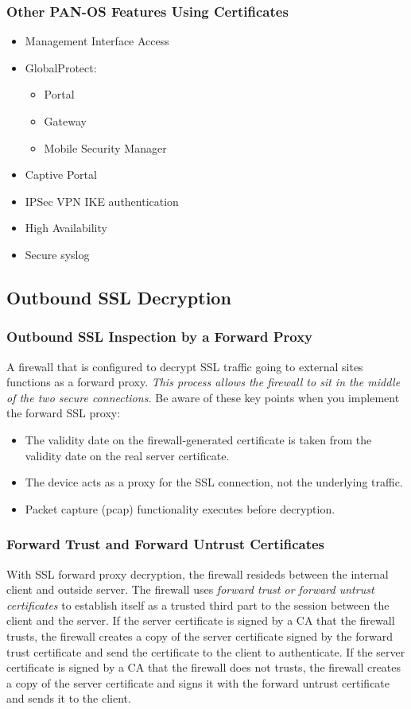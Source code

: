 \subsubsection{Other PAN-OS Features Using Certificates}
\begin{itemize}
    \item Management Interface Access
    \item GlobalProtect:
        \begin{itemize}
            \item Portal
            \item Gateway
            \item Mobile Security Manager
        \end{itemize}
    \item Captive Portal
    \item IPSec VPN IKE authentication
    \item High Availability 
    \item Secure syslog
\end{itemize}

\subsection{Outbound SSL Decryption}
\subsubsection{Outbound SSL Inspection by a Forward Proxy}
A firewall that is configured to decrypt SSL traffic going to external sites functions as a forward proxy.
\textit{This process allows the firewall to sit in the middle of the two secure connections.}
Be aware of these key points when you implement the forward SSL proxy:
\begin{itemize}
    \item The validity date on the firewall-generated certificate is taken from the validity date on the real server certificate.
    \item The device acts as a proxy for the SSL connection, not the underlying traffic.
    \item Packet capture (pcap) functionality executes before decryption.
\end{itemize}

\subsubsection{Forward Trust and Forward Untrust Certificates}
With SSL forward proxy decryption, the firewall resideds between the internal client and outside server.
The firewall uses \textit{forward trust or forward untrust certificates} to establish itself as a trusted third part to the session between the client and the server.
If the server certificate is signed by a CA that the firewall trusts, the firewall creates a copy of the server certificate signed by the forward trust certificate and send the certificate to the client to authenticate.
If the server certificate is signed by a CA that the firewall does not trusts, the firewall creates a copy of the server certificate and signs it with the forward untrust certificate and sends it to the client.
 
